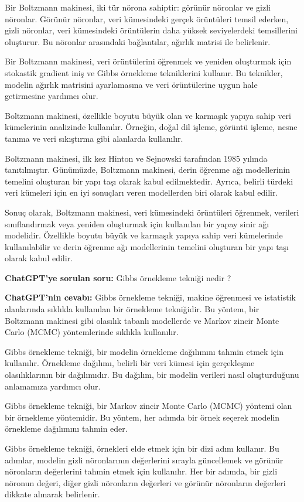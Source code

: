 \documentclass[11pt]{article}
\begin{document}
Bir Boltzmann makinesi, iki tür nörona sahiptir: görünür nöronlar ve gizli nöronlar. Görünür nöronlar, veri kümesindeki gerçek örüntüleri temsil ederken, gizli nöronlar, veri kümesindeki örüntülerin daha yüksek seviyelerdeki temsillerini oluşturur. Bu nöronlar arasındaki bağlantılar, ağırlık matrisi ile belirlenir.

Bir Boltzmann makinesi, veri örüntülerini öğrenmek ve yeniden oluşturmak için stokastik gradient iniş ve Gibbs örnekleme tekniklerini kullanır. Bu teknikler, modelin ağırlık matrisini ayarlamasına ve veri örüntülerine uygun hale getirmesine yardımcı olur.

Boltzmann makinesi, özellikle boyutu büyük olan ve karmaşık yapıya sahip veri kümelerinin analizinde kullanılır. Örneğin, doğal dil işleme, görüntü işleme, nesne tanıma ve veri sıkıştırma gibi alanlarda kullanılır.

Boltzmann makinesi, ilk kez Hinton ve Sejnowski tarafından 1985 yılında tanıtılmıştır. Günümüzde, Boltzmann makinesi, derin öğrenme ağı modellerinin temelini oluşturan bir yapı taşı olarak kabul edilmektedir. Ayrıca, belirli türdeki veri kümeleri için en iyi sonuçları veren modellerden biri olarak kabul edilir.

Sonuç olarak, Boltzmann makinesi, veri kümesindeki örüntüleri öğrenmek, verileri sınıflandırmak veya yeniden oluşturmak için kullanılan bir yapay sinir ağı modelidir. Özellikle boyutu büyük ve karmaşık yapıya sahip veri kümelerinde kullanılabilir ve derin öğrenme ağı modellerinin temelini oluşturan bir yapı taşı olarak kabul edilir.

\textbf{ChatGPT'ye sorulan soru: } Gibbs örnekleme tekniği nedir ?

\textbf{ChatGPT'nin cevabı: } Gibbs örnekleme tekniği, makine öğrenmesi ve istatistik alanlarında sıklıkla kullanılan bir örnekleme tekniğidir. Bu yöntem, bir Boltzmann makinesi gibi olasılık tabanlı modellerde ve Markov zincir Monte Carlo (MCMC) yöntemlerinde sıklıkla kullanılır.

Gibbs örnekleme tekniği, bir modelin örnekleme dağılımını tahmin etmek için kullanılır. Örnekleme dağılımı, belirli bir veri kümesi için gerçekleşme olasılıklarının bir dağılımıdır. Bu dağılım, bir modelin verileri nasıl oluşturduğunu anlamamıza yardımcı olur.

Gibbs örnekleme tekniği, bir Markov zincir Monte Carlo (MCMC) yöntemi olan bir örnekleme yöntemidir. Bu yöntem, her adımda bir örnek seçerek modelin örnekleme dağılımını tahmin eder.

Gibbs örnekleme tekniği, örnekleri elde etmek için bir dizi adım kullanır. Bu adımlar, modelin gizli nöronlarının değerlerini sırayla güncellemek ve görünür nöronların değerlerini tahmin etmek için kullanılır. Her bir adımda, bir gizli nöronun değeri, diğer gizli nöronların değerleri ve görünür nöronların değerleri dikkate alınarak belirlenir.
\end{document}
